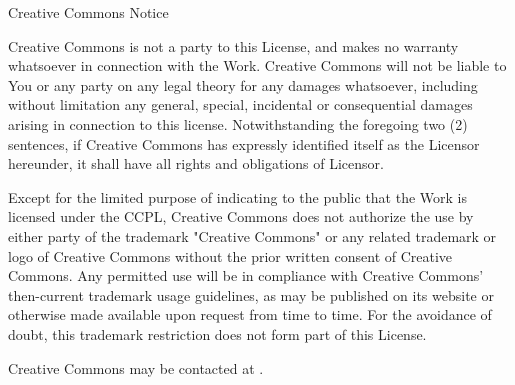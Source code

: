 Creative Commons Notice

Creative Commons is not a party to this License, and makes no warranty whatsoever in connection with the Work. Creative Commons will not be liable to You or any party on any legal theory for any damages whatsoever, including without limitation any general, special, incidental or consequential damages arising in connection to this license. Notwithstanding the foregoing two (2) sentences, if Creative Commons has expressly identified itself as the Licensor hereunder, it shall have all rights and obligations of Licensor.

Except for the limited purpose of indicating to the public that the Work is licensed under the CCPL, Creative Commons does not authorize the use by either party of the trademark "Creative Commons" or any related trademark or logo of Creative Commons without the prior written consent of Creative Commons. Any permitted use will be in compliance with Creative Commons' then-current trademark usage guidelines, as may be published on its website or otherwise made available upon request from time to time. For the avoidance of doubt, this trademark restriction does not form part of this License.

Creative Commons may be contacted at .

